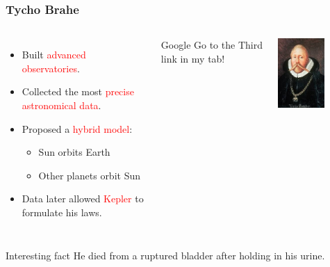 \documentclass[aspectratio=1611, 9pt]{beamer}
\begin{document}
\begin{frame}
  \frametitle{Tycho Brahe}
  \begin{columns}
    \begin{itemize}
      \item Built \textcolor{red}{advanced observatories}.
      \item Collected the most \textcolor{red}{precise astronomical data}.
      \item Proposed a \textcolor{red}{hybrid model}:
      \begin{itemize}
        \item Sun orbits Earth
        \item Other planets orbit Sun
      \end{itemize}
      \item Data later allowed \textcolor{red}{Kepler} to formulate his laws.
    \end{itemize}
    \begin{block}{Google}
      Go to the Third link in my tab!
      
    \end{block}
    \begin{center}
      \includegraphics[width=0.6\textwidth]{pictures/tycho.jpg}
    \end{center}
  \end{columns}
  \begin{alertblock}{Interesting fact}
    He died from a ruptured bladder after holding in his urine.
  \end{alertblock}
\end{frame}
\end{document}
